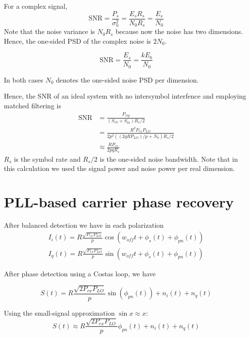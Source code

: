 \documentclass[a4paper]{article}
\begin{document}
For a complex signal, 
\begin{equation}
\mathrm{SNR} = \frac{P_s}{\sigma_n^2} = \frac{E_sR_s}{N_0R_s} = \frac{E_s}{N_0}
\end{equation}
Note that the noise variance is $N_0R_s$ because now the noise has two dimensions. Hence, the one-sided PSD of the complex noise is $2N_0$.

\begin{equation}
\mathrm{SNR} = \frac{E_s}{N_0} = \frac{kE_b}{N_0}
\end{equation}

In both cases $N_0$ denotes the one-sided noise PSD per dimension. 

Hence, the SNR of an ideal system with no intersymbol interfence and employing matched filtering is 
\begin{align} \nonumber
\mathrm{SNR} & = \frac{P_{sig}}{(S_{sh} + S_{th})R_s/2} \\ \nonumber
&= \frac{R^2P_{rx}P_{LO}}{2p^2((2qRP_{LO})/p + N_0)R_s/2} \\
&\approx \frac{RP_{rx}}{2pqR_s} 
\end{align}
$R_s$ is the symbol rate and $R_s/2$ is the one-sided noise bandwidth. Note that in this calculation we used the signal power and noise power per real dimension.

\section{PLL-based carrier phase recovery}

After balanced detection we have in each polarization
\begin{align}
I_i(t) = R\frac{\sqrt{P_{rx}P_{LO}}}{p}\cos(w_{off}t + \phi_s(t) + \phi_{pn}(t)) \\
I_q(t) =  R\frac{\sqrt{P_{rx}P_{LO}}}{p}\sin(w_{off}t + \phi_s(t) + \phi_{pn}(t))
\end{align}

After phase detection using a Costas loop, we have

\begin{equation}
S(t) = R\frac{\sqrt{2P_{rx}P_{LO}}}{p}\sin(\phi_{pn}(t)) + n_i(t) + n_q(t)
\end{equation}

Using the small-signal approximation $\sin x \approx x$:
\begin{equation}
S(t) \approx R\frac{\sqrt{2P_{rx}P_{LO}}}{p}\phi_{pn}(t) + n_i(t) + n_q(t)
\end{equation}
\end{document}
